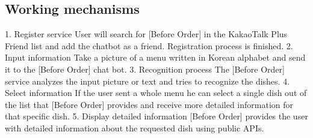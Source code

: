 \subsection{Working mechanisms}
1. Register service
User will search for [Before Order] in the KakaoTalk Plus Friend list and add the chatbot as a friend. Registration process is finished.
2. Input information
Take a picture of a menu written in Korean alphabet and send it to the [Before Order] chat bot.
3. Recognition process
The [Before Order] service analyzes the input picture or text and tries to recognize the dishes.
4. Select information
If the user sent a whole menu he can select a single dish out of the list that [Before Order] provides and receive more detailed information for that specific dish.
5. Display detailed information
[Before Order] provides the user with detailed information about the requested dish using public APIs.

